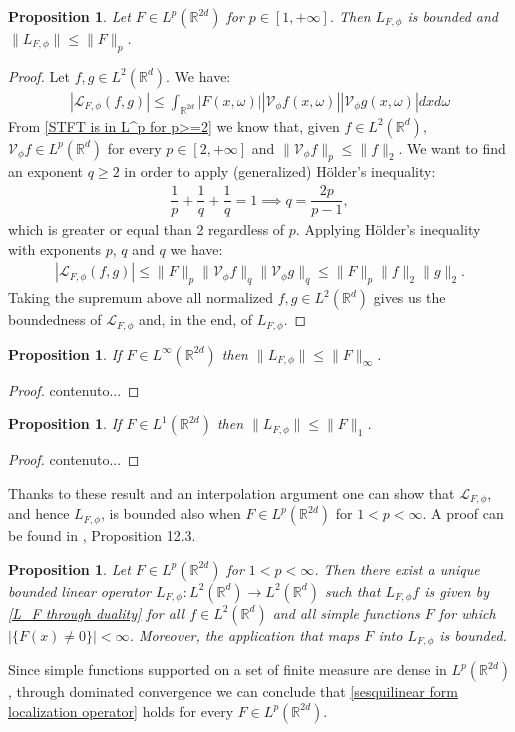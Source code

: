 \documentclass[corpo=11pt, stile=classica, tipotesi=custom,
greek, evenboxes, english]{toptesi}
\numberwithin{equation}{chapter}
\newtheorem{prop}[teo]{Proposition}
\theoremstyle{remark}
\newcommand{\R}{\mathbb{R}} %
\newcommand{\V}{\mathcal{V}} %
\renewcommand{\L}{\mathscr{L}} %
\begin{document}
{\color{red}\begin{prop}\label{F in L^p L_F bounded}
	Let $F \in L^p(\R^{2d})$ for $p \in [1,+\infty]$. Then $L_{F,\phi}$ is bounded and $\|L_{F,\phi}\| \leq \|F\|_p$.
\end{prop}
\begin{proof}
	Let $f,g \in L^2(\R^d)$. We have:
	\begin{align*}
		|\L_{F,\phi} (f,g)| \leq \int_{\R^{2d}} |F(x,\omega)| |\V_{\phi}f(x,\omega)| |\V_{\phi}g(x,\omega)| dxd\omega 
	\end{align*}
	From \eqref{STFT is in L^p for p>=2} we know that, given $f \in L^2(\R^d)$, $\V_{\phi} f \in L^p(\R^d)$ for every $p \in [2,+\infty]$ and $\|\V_{\phi} f\|_p \leq \|f\|_2$. We want to find an exponent $q \geq 2$ in order to apply (generalized) H\"older's inequality:
	\begin{align*}
		\dfrac{1}{p} + \dfrac{1}{q} + \dfrac{1}{q} = 1 \implies q =  \dfrac{2p}{p-1},
	\end{align*}
	which is greater or equal than 2 regardless of $p$. Applying H\"older's inequality with exponents $p$, $q$ and $q$ we have:
	\begin{align*}
		|\L_{F,\phi} (f,g)| \leq \|F\|_p \|\V_{\phi}f\|_q \|\V_{\phi}g\|_q \leq \|F\|_p \|f\|_2 \|g\|_2.
	\end{align*}
	Taking the supremum above all normalized $f,g \in L^2(\R^d)$ gives us the boundedness of $\L_{F,\phi}$ and, in the end, of $L_{F,\phi}$.
\end{proof}}
\begin{prop}\label{F bounded L_F bounded}
	If $F \in L^{\infty}(\R^{2d})$ then $\| L_{F,\phi}\| \leq \| F \|_{\infty}$.
\end{prop}
\begin{proof}
	contenuto...
\end{proof}
\begin{prop}\label{F integrable L_F bounded}
	If $F \in L^1(\R^{2d})$ then $\| L_{F,\phi}\| \leq \| F \|_1$.
\end{prop}
\begin{proof}
	contenuto...
\end{proof}
Thanks to these result and an interpolation argument one can show that $\L_{F,\phi}$, and hence $L_{F,\phi}$, is bounded also when $F \in L^p(\R^{2d})$ for $1 < p < \infty$. A proof can be found in \cite{wong}, Proposition 12.3.
\begin{prop}\label{F in Lp L_F bounded}
	Let $F \in L^p(\R^{2d})$ for $1 < p < \infty$. Then there exist a unique bounded linear operator $L_{F,\phi} : L^2(\R^d) \rightarrow L^2(\R^d)$ such that $L_{F,\phi} f$ is given by \eqref{L_F through duality} for all $f \in L^2(\R^d)$ and all simple functions $F$ for which $|\{F(x) \neq 0\}| < \infty$. Moreover, the application that maps $F$ into $L_{F,\phi}$ is bounded.
\end{prop}
{\color{blue} Since simple functions supported on a set of finite measure are dense in $L^p(\R^{2d})$, through dominated convergence we can conclude that \eqref{sesquilinear form localization operator} holds for every $F \in L^p(\R^{2d})$.}
\end{document}
